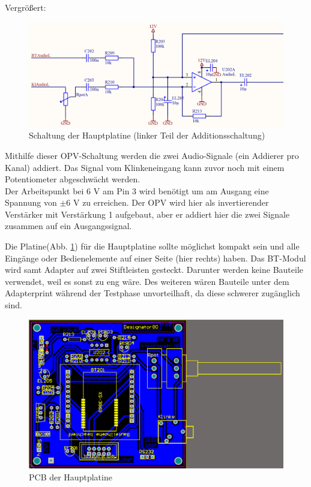 Vergrößert:
\begin{figure} [H]
	\centering
	\includegraphics[width=1\textwidth]{img/BTModul/hauptboard_sch2_zoom.png}
	\caption{Schaltung der Hauptplatine (linker Teil der Additionsschaltung)}
\end{figure}
Mithilfe dieser OPV-Schaltung werden die zwei Audio-Signale (ein Addierer pro Kanal) addiert.
Das Signal vom Klinkeneingang kann zuvor noch mit einem Potentiometer abgeschwächt werden.
\\
Der Arbeitspunkt bei 6 V am Pin 3 wird benötigt um am Ausgang eine Spannung von $\pm$6 V zu erreichen. Der OPV wird hier als invertierender Verstärker mit Verstärkung 1 aufgebaut, aber er addiert hier die zwei Signale zusammen auf ein Ausgangssignal.
\newpage

Die Platine(Abb. \ref {fig:4.1.8.3.1}) für die Hauptplatine sollte möglichst kompakt sein und alle Eingänge oder Bedienelemente auf einer Seite (hier rechts) haben.
Das BT-Modul wird samt Adapter auf zwei Stiftleisten gesteckt.
Darunter werden keine Bauteile verwendet, weil es sonst zu eng wäre.
Des weiteren wären Bauteile unter dem Adapterprint während der Testphase unvorteilhaft, da diese schwerer zugänglich sind.
\begin{figure} [H]
	\centering
	\includegraphics[width=1\textwidth]{img/BTModul/hauptboard_pcb.png}
	\caption{PCB der Hauptplatine}\label {fig:4.1.8.3.1}
\end{figure}
\newpage


